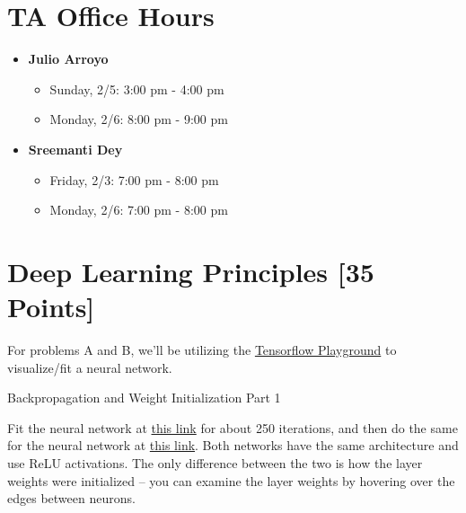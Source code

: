 \section*{TA Office Hours}
\begin{itemize}
    \item \textbf{Julio Arroyo}
        \begin{itemize}
            \item Sunday, 2/5: 3:00 pm - 4:00 pm
            \item Monday, 2/6: 8:00 pm - 9:00 pm
        \end{itemize}
    \item \textbf{Sreemanti Dey}
        \begin{itemize}
            \item Friday, 2/3: 7:00 pm - 8:00 pm
            \item Monday, 2/6: 7:00 pm - 8:00 pm
        \end{itemize}
\end{itemize}


\newpage
\section{Deep Learning Principles [35 Points]}

 For problems A and B, we'll be utilizing the \href{http://playground.tensorflow.org/}{Tensorflow Playground} to visualize/fit a neural network.

\begin{problem}[5]
  Backpropagation and Weight Initialization Part 1
\end{problem}

Fit the neural network at \href{http://playground.tensorflow.org/#activation=relu&batchSize=10&dataset=circle&regDataset=reg-plane&learningRate=0.03&regularizationRate=0&noise=0&networkShape=4,2&seed=0.65409&showTestData=false&discretize=false&percTrainData=50&x=true&y=true&xTimesY=false&xSquared=false&ySquared=false&cosX=false&sinX=false&cosY=false&sinY=false&collectStats=false&problem=classification&initZero=false&hideText=false}{this link} for about 250 iterations, and then do the same for the neural network at \href{http://playground.tensorflow.org//\#activation=relu&batchSize=10&dataset=circle&regDataset=reg-plane&learningRate=0.03&regularizationRate=0&noise=0&networkShape=4,2&seed=0.6&showTestData=false&discretize=false&percTrainData=50&x=true&y=true&xTimesY=false&xSquared=false&ySquared=false&cosX=false&sinX=false&cosY=false&sinY=false&collectStats=false&problem=classification&initZero=true&hideText=false}{this link}.  Both networks have the same architecture and use ReLU activations.  The only difference between the two is how the layer weights were initialized -- you can examine the layer weights by hovering over the edges between neurons.

